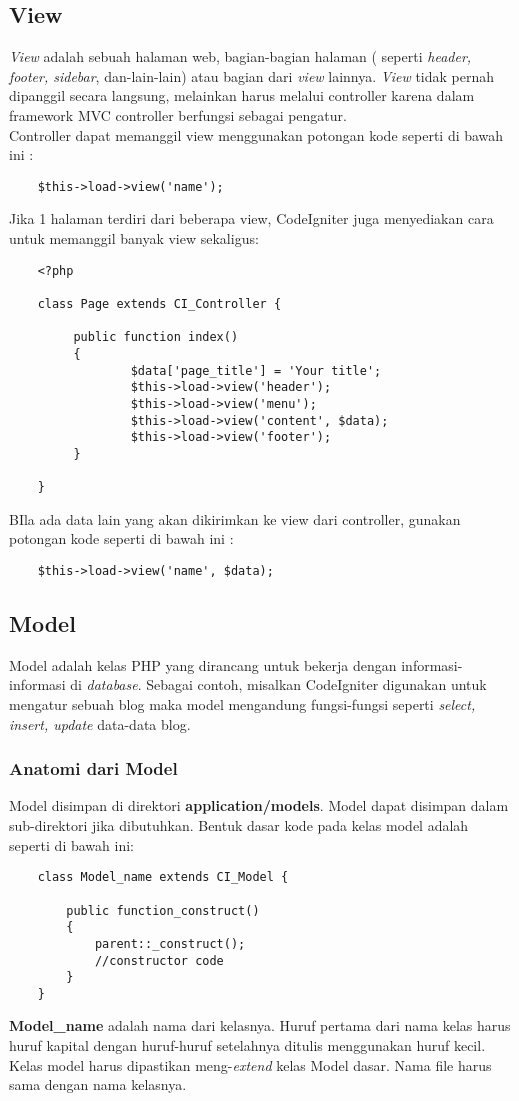 \subsection{View}
\textit{View} adalah sebuah halaman web, bagian-bagian halaman ( seperti \textit{header, footer, sidebar}, dan-lain-lain) atau bagian dari \textit{view} lainnya. \textit{View} tidak pernah dipanggil secara langsung, melainkan harus melalui controller karena dalam framework MVC controller berfungsi sebagai pengatur.\\
Controller dapat memanggil view menggunakan potongan kode seperti di bawah ini :
\begin{lstlisting}
	$this->load->view('name');
\end{lstlisting}
Jika 1 halaman terdiri dari beberapa view, CodeIgniter juga menyediakan cara untuk memanggil banyak view sekaligus:
\begin{lstlisting}
	<?php

	class Page extends CI_Controller {

       	 public function index()
       	 {
        	     $data['page_title'] = 'Your title';
        	     $this->load->view('header');
        	     $this->load->view('menu');
       	         $this->load->view('content', $data);
       	         $this->load->view('footer');
       	 }

	}
\end{lstlisting}
BIla ada data lain yang akan dikirimkan ke view dari controller, gunakan potongan kode seperti di bawah ini :
\begin{lstlisting}
	$this->load->view('name', $data);
\end{lstlisting}

\subsection{Model}
Model adalah kelas PHP yang dirancang untuk bekerja dengan informasi-informasi di \textit{database}. Sebagai contoh, misalkan CodeIgniter digunakan untuk mengatur sebuah blog maka model mengandung fungsi-fungsi seperti \textit{select, insert, update }data-data blog.

\subsubsection{Anatomi dari Model}
Model disimpan di direktori \textbf{application/models}. Model dapat disimpan dalam sub-direktori jika dibutuhkan. Bentuk dasar kode pada kelas model adalah seperti di bawah ini:
\begin{lstlisting}
	class Model_name extends CI_Model {
	
		public function_construct()
		{
			parent::_construct();
			//constructor code
		}
	}
\end{lstlisting}
\textbf{Model\_name} adalah nama dari kelasnya. Huruf pertama dari nama kelas harus huruf kapital dengan huruf-huruf setelahnya ditulis menggunakan huruf kecil. Kelas model harus dipastikan meng-\textit{extend} kelas Model dasar. Nama file harus sama dengan nama kelasnya.


